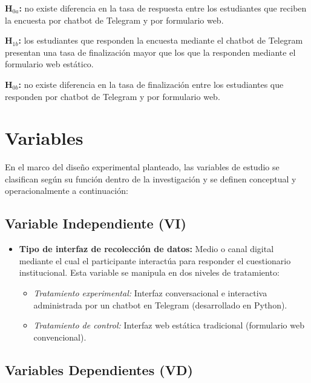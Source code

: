 \documentclass[12pt,letterpaper]{article}
\begin{document}
\textbf{H$_{0a}$:} no existe diferencia en la tasa de respuesta entre los estudiantes que reciben la encuesta por chatbot de Telegram y por formulario web.

\textbf{H$_{1b}$:} los estudiantes que responden la encuesta mediante el chatbot de Telegram presentan una tasa de finalización mayor que los que la responden mediante el formulario web estático.

\textbf{H$_{0b}$:} no existe diferencia en la tasa de finalización entre los estudiantes que responden por chatbot de Telegram y por formulario web. 

\section{Variables}

En el marco del diseño experimental planteado, las variables de estudio se clasifican según su función dentro de la investigación y se definen conceptual y operacionalmente a continuación:

\subsection{Variable Independiente (VI)}

\begin{itemize}
    \item \textbf{Tipo de interfaz de recolección de datos:} Medio o canal digital mediante el cual el participante interactúa para responder el cuestionario institucional. Esta variable se manipula en dos niveles de tratamiento:
    \begin{itemize}
        \item \textit{Tratamiento experimental:} Interfaz conversacional e interactiva administrada por un chatbot en Telegram (desarrollado en Python).
        \item \textit{Tratamiento de control:} Interfaz web estática tradicional (formulario web convencional).
    \end{itemize}
\end{itemize}

\subsection{Variables Dependientes (VD)}
\end{document}

